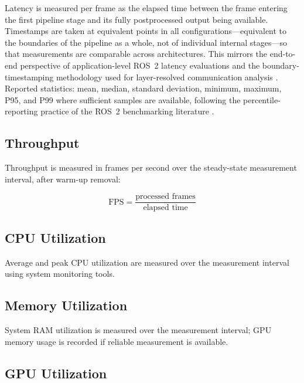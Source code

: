 Latency is measured per frame as the elapsed time between the frame
entering the first pipeline stage and its fully postprocessed output being
available. Timestamps are taken at equivalent points in all
configurations---equivalent to the boundaries of the pipeline as a whole,
not of individual internal stages---so that measurements are comparable
across architectures. This mirrors the end-to-end perspective of
application-level ROS~2 latency evaluations \cite{betz2023a} and the
boundary-timestamping methodology used for layer-resolved communication
analysis \cite{kamiya2025}.
 Reported statistics: mean, median, standard
deviation, minimum, maximum, P95, and P99 where sufficient samples are
available, following the percentile-reporting practice of the ROS~2
benchmarking literature \cite{kronauer2021, macenski2022}.

\subsection{Throughput}

Throughput is measured in frames per second over the steady-state
measurement interval, after warm-up removal:

\begin{equation}
  \mathrm{FPS} = \frac{\text{processed frames}}{\text{elapsed time}}
  \label{eq:fps}
\end{equation}

\subsection{CPU Utilization}

Average and peak CPU utilization are measured over the measurement
interval using system monitoring tools.

\subsection{Memory Utilization}

System RAM utilization is measured over the measurement interval; GPU
memory usage is recorded if reliable measurement is available.

\subsection{GPU Utilization}

